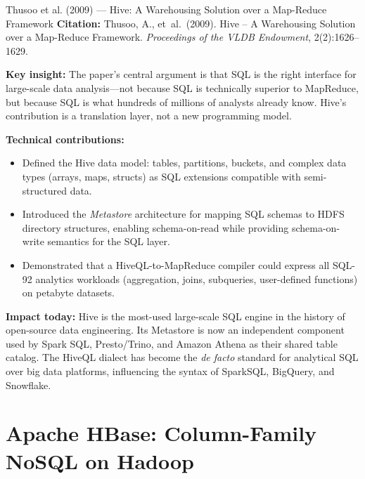\begin{researchspotlight}{Thusoo et al. (2009) --- Hive: A Warehousing Solution over a Map-Reduce Framework}
\textbf{Citation:} Thusoo, A., et~al.\ (2009). Hive -- A Warehousing
Solution over a Map-Reduce Framework. \textit{Proceedings of the
VLDB Endowment}, 2(2):1626--1629. \parencite{Hive2009}

\smallskip\noindent
\textbf{Key insight:} The paper's central argument is that SQL is the
right interface for large-scale data analysis---not because SQL is
technically superior to MapReduce, but because SQL is what hundreds
of millions of analysts already know. Hive's contribution is a
translation layer, not a new programming model.

\smallskip\noindent
\textbf{Technical contributions:}
\begin{itemize}
  \item Defined the Hive data model: tables, partitions, buckets,
        and complex data types (arrays, maps, structs) as SQL
        extensions compatible with semi-structured data.
  \item Introduced the \emph{Metastore} architecture for mapping
        SQL schemas to HDFS directory structures, enabling schema-on-read
        while providing schema-on-write semantics for the SQL layer.
  \item Demonstrated that a HiveQL-to-MapReduce compiler could express
        all SQL-92 analytics workloads (aggregation, joins,
        subqueries, user-defined functions) on petabyte datasets.
\end{itemize}

\smallskip\noindent
\textbf{Impact today:} Hive is the most-used large-scale SQL
engine in the history of open-source data engineering. Its Metastore
is now an independent component used by Spark SQL, Presto/Trino,
and Amazon Athena as their shared table catalog. The HiveQL dialect
has become the \emph{de facto} standard for analytical SQL over
big data platforms, influencing the syntax of SparkSQL, BigQuery,
and Snowflake.
\end{researchspotlight}

\section{Apache HBase: Column-Family NoSQL on Hadoop}
\label{sec:hbase}

